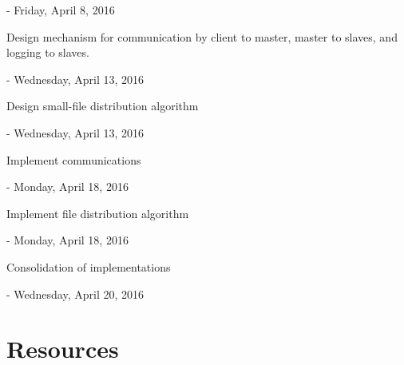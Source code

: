 \documentclass{article}
\begin{document}
- Friday, April 8, 2016

Design mechanism for communication by client to master, master to slaves, and logging to slaves. 

- Wednesday, April 13, 2016

Design small-file distribution algorithm

- Wednesday, April 13, 2016

Implement communications

- Monday, April 18, 2016

Implement file distribution algorithm

- Monday, April 18, 2016

Consolidation of implementations

- Wednesday, April 20, 2016

\section{Resources}
\end{document}
